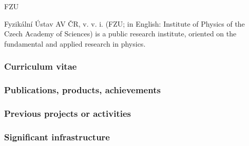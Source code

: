 \begin{sitedescription}{FZU}

Fyzikální Ústav AV ČR, v. v. i. (FZU; in English: Institute of Physics of the Czech Academy
of Sciences) is a public research institute, oriented on the fundamental and applied
research in physics.

\subsubsection*{Curriculum vitae}



\subsubsection*{Publications, products, achievements}

\begin{compactenum}
\item {}
\end{compactenum}

\subsubsection*{Previous projects or activities}

\begin{compactenum}
\item {}
\end{compactenum}

\subsubsection*{Significant infrastructure}

\end{sitedescription}

